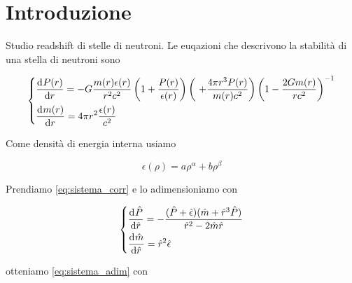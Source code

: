 \documentclass[a4paper, titlepage]{article}
\begin{document}
\section{Introduzione}
Studio readshift di stelle di neutroni. Le euqazioni che descrivono la stabilità di una stella di neutroni sono

\begin{equation}
    \begin{dcases}
        \dv[]{P(r)}{r} = - G \frac{m(r) \epsilon (r)}{r^2 c^2} \left(1 + \frac{P(r)}{\epsilon (r)} \right) \left(\ + \frac{4 \pi r^3 P(r)}{m(r) c^2} \right) \left(1 - \frac{2 G m(r)}{r c^2} \right)^{-1} \\
        \dv[]{m(r)}{r} = 4 \pi r^2 \frac{\epsilon (r)}{c^2}
    \end{dcases}
    \label{eq:sistema_corr}
\end{equation}

Come densità di energia interna usiamo

\begin{equation}
    \epsilon (\rho) = a \rho ^{\alpha} + b \rho ^{\beta}
\end{equation}

Prendiamo \ref{eq:sistema_corr} e lo adimensioniamo con

\begin{equation}
    \begin{dcases}
        \dv[]{\hat{P}}{\hat{r}}=-\frac{(\hat{P}+\hat{\epsilon})(\hat{m}+\hat{r}^3\hat{P})}{\hat{r}^2-2\hat{m}\hat{r}}\\
        \dv[]{\hat{m}}{\hat{r}}= \hat{r}^2 \hat{\epsilon}
    \end{dcases}
    \label{eq:sistema_adim}
\end{equation}

otteniamo \ref{eq:sistema_adim} con
\end{document}
